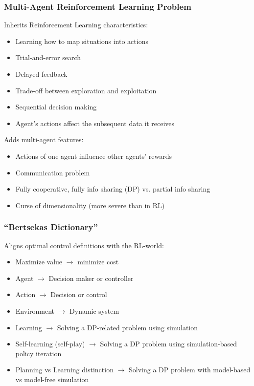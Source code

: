 \documentclass{beamer}
\begin{document}


    \begin{frame}
        \frametitle{Multi-Agent Reinforcement Learning Problem}
        Inherits Reinforcement Learning characteristics:
        \begin{itemize}
            \item Learning how to map situations into actions
            \item Trial-and-error search
            \item Delayed feedback
            \item Trade-off between exploration and exploitation
            \item Sequential decision making
            \item Agent's actions affect the subsequent data it receives
        \end{itemize}

        Adds multi-agent features:
        \begin{itemize}
            \item Actions of one agent influence other agents' rewards
            \item Communication problem
            \item Fully cooperative, fully info sharing (DP) vs. partial info sharing
            \item Curse of dimensionality (more severe than in RL)
        \end{itemize}

    \end{frame}



\begin{frame}
	\frametitle{``Bertsekas Dictionary''}
	
	Aligns optimal control definitions with the RL-world:
	\begin{itemize}
		\item Maximize value $\rightarrow$ minimize cost		
		\item Agent $\rightarrow$ Decision maker or controller
		\item Action $\rightarrow$ Decision or control
		\item Environment  $\rightarrow$ Dynamic system
		\item Learning $\rightarrow$ Solving a DP-related problem using simulation
		\item Self-learning (self-play) $\rightarrow$ Solving a DP problem using simulation-based policy iteration
		\item Planning vs Learning distinction $\rightarrow$ Solving a DP problem with model-based vs model-free simulation	
	\end{itemize}
	
\end{frame}
\end{document}
